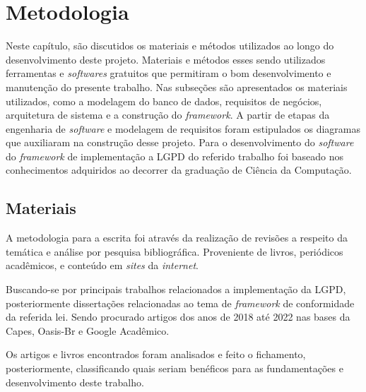\documentclass[
	12pt,				%
	openright,			%
	oneside,			%
	a4paper,			%
	english,			%
	french,				%
	spanish,			%
	brazil,				%
	]{abntex2}
\begin{document}

\chapter{Metodologia}
\label{ch: materiais e métodos}

Neste capítulo, são discutidos os materiais e métodos utilizados ao longo do desenvolvimento deste projeto. Materiais e métodos esses sendo utilizados ferramentas e \textit{softwares} gratuitos que permitiram o bom desenvolvimento e manutenção do presente trabalho.
Nas subseções são apresentados os materiais utilizados, como a modelagem do banco de dados, requisitos de negócios, arquitetura de sistema e a construção do \textit{framework}. A partir de etapas da engenharia de \textit{software} e modelagem de requisitos foram estipulados os diagramas que auxiliaram na construção desse projeto.
Para o desenvolvimento do \textit{software} do \textit{framework} de implementação a LGPD do referido trabalho foi baseado nos conhecimentos adquiridos ao decorrer da graduação de Ciência da Computação.


\section{Materiais}

A metodologia para a escrita foi através da realização de revisões a respeito da temática e análise por pesquisa bibliográfica. Proveniente de livros, periódicos acadêmicos, e conteúdo em \textit{sites} da \textit{internet}.

Buscando-se por principais trabalhos relacionados a implementação da LGPD, posteriormente dissertações relacionadas ao tema de \textit{framework}  de conformidade da referida lei. Sendo procurado artigos dos anos de 2018 até 2022 nas bases da Capes, Oasis-Br e Google Acadêmico. 

Os artigos e livros encontrados foram analisados e feito o fichamento, posteriormente, classificando quais seriam benéficos para as fundamentações e desenvolvimento deste trabalho.

\end{document}
